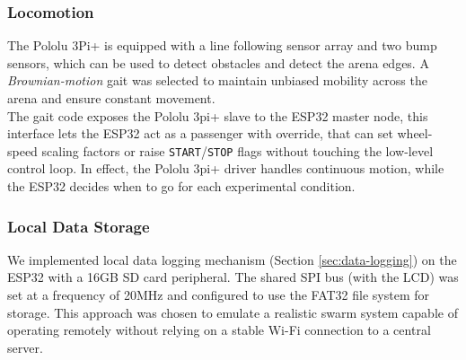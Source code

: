 \documentclass[conference]{IEEEtran}
\begin{document}
\subsubsection{Locomotion}\label{sec:locomotion}

The Pololu 3Pi+ is equipped with a line following sensor array and two bump sensors, which can be used to detect obstacles and detect the arena edges. A \emph{Brownian-motion} gait was selected to maintain unbiased mobility across the arena and ensure constant movement.\\

The gait code exposes the Pololu 3pi+ slave to the ESP32 master node, this interface lets the ESP32 act as a passenger with override, that can set wheel-speed scaling factors or raise \texttt{START}/\texttt{STOP} flags without touching the low-level control loop. In effect, the Pololu 3pi+ driver handles continuous motion, while the ESP32 decides when to go for each experimental condition.\\

\subsubsection{Local Data Storage}
We implemented local data logging mechanism (Section \ref{sec:data-logging}) on the ESP32 with a 16GB SD card peripheral. The shared SPI bus (with the LCD) was set at a frequency of 20MHz and configured to use the FAT32 file system for storage. This approach was chosen to emulate a realistic swarm system capable of operating remotely without relying on a stable Wi-Fi connection to a central server.\\


\end{document}
